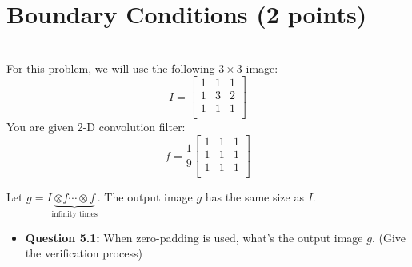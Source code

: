 \section{Boundary Conditions (2 points)}

\\For this problem, we will use the following $3 \times 3$ image:
\begin{equation}
I = 
	\begin{bmatrix}
	1 & 1 & 1 \\
    1 & 3 & 2 \\ 
    1 & 1 & 1 \\
	\end{bmatrix}
\end{equation}
You are given 2-D convolution filter:
\begin{equation}
f = 
	\frac{1}{9}\begin{bmatrix}
	1 & 1 & 1 \\
    1 & 1 & 1 \\ 
    1 & 1 & 1 \\
	\end{bmatrix}
\end{equation}

\noindent Let \( g = I \underbrace{\otimes f\cdots \otimes f}_{\textrm{infinity times}}\). The output image $g$ has the same size as $I$.\\


\begin{itemize}
\item \textbf{Question 5.1:} When zero-padding is used, what's the output image $g$. (Give the verification process)
\end{itemize}
